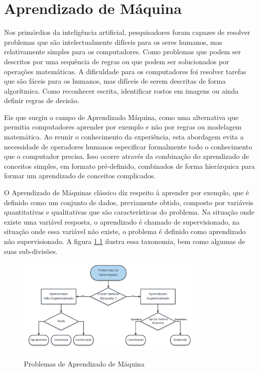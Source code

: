 
\chapter{Aprendizado de Máquina}
\label{chap:MachineLearning}

Nos primórdios da inteligência artificial, pesquisadores foram capazes de resolver problemas que são intelectualmente difíceis para os seres humanos, mas relativamente simples para os computadores. Como problemas que podem ser descritos por uma sequência de regras ou que podem ser solucionados por operações matemáticas. A dificuldade para os computadores foi resolver tarefas que são fáceis para os humanos, mas difíceis de serem descritas de forma algorítmica.  Como reconhecer escrita, identificar rostos em imagens ou ainda definir regras de decisão.

Eis que surgiu o campo de Aprendizado Máquina, como uma alternativa que permitia computadores aprender por exemplo e não por regras ou modelagem matemática. Ao reunir o conhecimento da experiência, esta abordagem evita a necessidade de operadores humanos especificar formalmente todo o conhecimento que o computador precisa. Isso ocorre através da combinação do aprendizado de conceitos simples, em formato pré-definido, combinados de forma hierárquica para formar um aprendizado de conceitos complicados.

O Aprendizado de Máquinas clássico diz respeito à aprender por exemplo, que é definido como um conjunto de dados, previamente obtido, composto por variáveis quantitativas e qualitativas que são características do problema. Na situação onde existe uma variável resposta, o aprendizado é chamado de supervisionado, na situação onde essa variável não existe, o problema é definido como aprendizado não supervisionado. A figura \ref{fig:MLProblems} ilustra essa taxonomia, bem como algumas de suas sub-divisões.


\begin{figure}[!htb]
	\centering
	\caption{Problemas de Aprendizado de Máquina} 
	\includegraphics[width=0.8\textwidth]{./04-figuras/MLProblems.png}
	\label{fig:MLProblems}
\end{figure}

